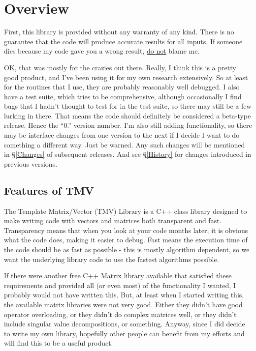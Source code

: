 
\section{Overview}

First, this library is provided without any warranty of any kind.  There is no guarantee
that the code will produce accurate results for all inputs.  If someone dies because
my code gave you a wrong result, \underline{do not} blame me.

OK, that was mostly for the crazies out there.  Really, I think this is a pretty good 
product, and I've been using it for my own research extensively.  So at least 
for the routines that I use, they are probably reasonably well debugged.
I also have a test suite, which tries to be comprehensive, although
occasionally I find bugs that I hadn't thought to test for in the test suite, so 
there may still be a few lurking in there.  That means the code should definitely be considered
a beta-type release.  Hence the ``0.'' version number.  I'm also still adding functionality,
so there may be interface changes from one version to the next if I decide I 
want to do something a different way.  Just be warned.  Any such changes will be 
mentioned in \S\ref{Changes} of subsequent releases.  And see \S\ref{History}
for changes introduced in previous versions.

\subsection{Features of TMV}

The Template Matrix/Vector (TMV) Library is a C++ class library designed to make
writing code with vectors and matrices both transparent and fast.  Transparency 
means that when you look at your code months later, it is obvious what the code
does, making it easier to debug.  Fast means the execution time of the code should
be as fast as possible - this is mostly algorithm dependent, so we want the 
underlying library code to use the fastest algorithms possible.

If there were another free C++ Matrix library available that satisfied these requirements
and provided all (or even most) of the functionality I wanted, I probably would
not have written this.  But, at least when I started writing this, the available matrix libraries
were not very good.  Either they didn't have good operator overloading, or they 
didn't do complex matrices well, or they didn't include singular value decompositions,
or something.  Anyway, since I did decide to write 
my own library, hopefully other people can benefit from my efforts and will find 
this to be a useful product.

